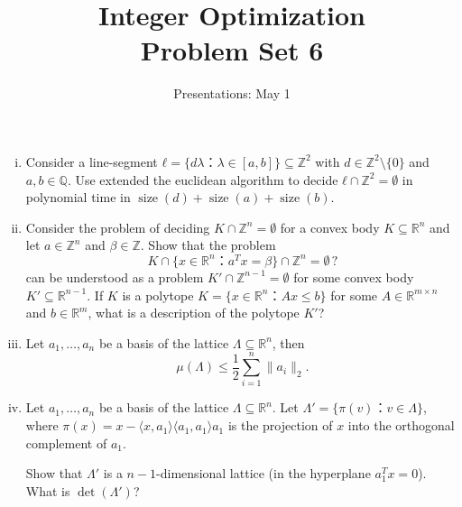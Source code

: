 \documentclass[11pt,a4paper]{article}
\title{Integer Optimization  \\ Problem Set 6 }
\date{Presentations: May 1}
\DeclareMathOperator{\size}{size}
\begin{document}
\maketitle 

\begin{enumerate}[i)]
\item  Consider a line-segment  $ℓ = \{ d λ ： λ ∈ [a,b]\} ⊆ ℤ^2 $ with $d ∈ℤ^2 \setminus \{0\}$ and $a,b ∈ℚ$. Use extended the euclidean algorithm to decide $ℓ ∩ ℤ^2 = \emptyset$ in polynomial time in $\size(d) + \size(a) + \size(b)$.
\item Consider the problem of deciding $ K ∩ ℤ^n = \emptyset$ for a convex body $K⊆ℝ^n$ and let $a ∈ℤ^n$ and $β ∈ ℤ$. Show that the problem
  \begin{displaymath}
     K ∩ \{x ∈ ℝ^n ：a^Tx = β\} ∩  ℤ^n = \emptyset \, ?
   \end{displaymath}
   can be understood as a problem $ K' ∩ ℤ^{n-1} = \emptyset$ for some convex body $K' ⊆ ℝ^{n-1}$. If $K$  is a polytope $K = \{ x ∈ ℝ^n ： Ax ≤ b \}$ for some $A ∈ ℝ^{m ×n}$ and $b ∈ ℝ^m$, what is a description of the polytope $K'$?
 \item Let $a_1,\dots,a_n$ be a basis of the lattice $Λ ⊆ ℝ^n$, then 
   \begin{displaymath}
     μ(Λ) ≤ \frac{1}{2}∑_{i=1}^n \|a_i\|_2.    
   \end{displaymath}

 \item Let $a_1,\dots,a_n$ be a basis of the lattice $Λ ⊆ ℝ^n$. Let $Λ' = \{ π(v) ： v ∈ Λ\}$, where $π(x) = x - 〈x,a_1 〉 〈a_1,a_1 〉 a_1$ is the projection of $x$ into the orthogonal complement of $a_1$.

   Show that $Λ'$ is a $n-1$-dimensional lattice (in the hyperplane $a_1^T x = 0$). What is $\det(Λ')$? 
\end{enumerate}



%
%


 
\end{document}
